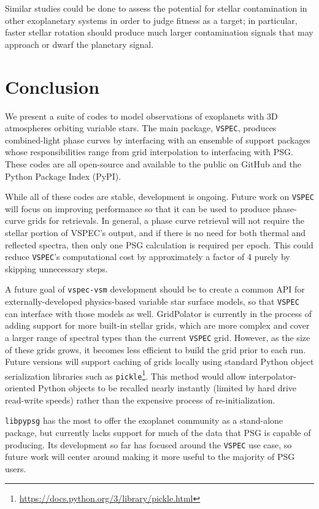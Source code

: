 \documentclass[linenumbers,preprint,authoryear]{elsarticle}
\newcommand{\vspec}[1]{\texttt{VSPEC}#1}
\begin{document}
Similar studies could be done to assess the potential for
stellar contamination in other exoplanetary systems in order to judge fitness as a target; in particular, faster stellar rotation should produce much larger contamination signals that may approach or dwarf the planetary signal.

\section{Conclusion}
\label{sec:conclusion}
We present a suite of codes to model observations of exoplanets with 3D atmospheres orbiting variable stars. The main package, \vspec{}, produces combined-light phase curves by interfacing with an ensemble of support packages whose responsibilities range from grid interpolation to interfacing with PSG. These codes are all open-source and available to the public on GitHub and the Python Package Index (PyPI).

While all of these codes are stable, development is ongoing. Future work on \vspec{} will focus on improving performance so that it can be used to produce phase-curve grids for retrievals. In general, a phase curve retrieval will not require the stellar portion of VSPEC's output, and if there is no need for both thermal and reflected spectra, then only one PSG calculation is required per epoch. This could reduce \vspec{}'s computational cost by approximately a factor of 4 purely by skipping unnecessary steps.

A future goal of \texttt{vspec-vsm} development should be to create a common API for externally-developed physics-based variable star surface models, so that \vspec{} can interface with those models as well. GridPolator is currently in the process of adding support for more built-in stellar grids, which are more complex and cover a larger range of spectral types than the current \vspec{} grid. However, as the size of these grids grows, it becomes less efficient to build the grid prior to each run. Future versions will support caching of grids locally using standard Python object serialization libraries such as \texttt{pickle}\footnote{\url{https://docs.python.org/3/library/pickle.html}}. This method would allow interpolator-oriented Python objects to be recalled nearly instantly (limited by hard drive read-write speeds) rather than the expensive process of re-initialization.

\texttt{libpypsg} has the most to offer the exoplanet community as a stand-alone package, but currently lacks support for much of the data that PSG is capable of producing. Its development so far has focused around the \vspec{} use case, so future work will center around making it more useful to the majority of PSG users.
\end{document}

